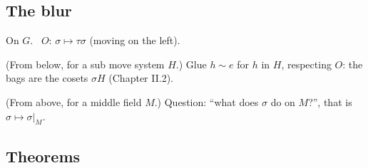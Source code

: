 \subsection*{The blur}

On $G$. \ $O$: $\sigma \mapsto \tau\sigma$ (moving on the left).

\begin{lines}
\item[\lab{B1}] (From below, for a sub move system $H$.) Glue $h \sim e$ for $h$ in $H$, respecting $O$: the bags are the cosets $\sigma H$ (Chapter II.2).
\item[\lab{B2}] (From above, for a middle field $M$.) Question: ``what does $\sigma$ do on $M$?'', that is $\sigma \mapsto \sigma|_M$.
\end{lines}

\subsection*{Theorems}


